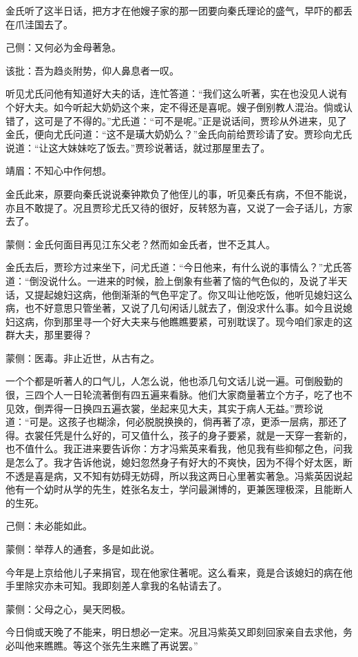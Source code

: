\begin{parag}
    金氏听了这半日话，把方才在他嫂子家的那一团要向秦氏理论的盛气，早吓的都丢在爪洼国去了。\begin{note}己侧：又何必为金母著急。\end{note}\begin{note}该批：吾为趋炎附势，仰人鼻息者一叹。\end{note}听见尤氏问他有知道好大夫的话，连忙答道：“我们这么听著，实在也没见人说有个好大夫。如今听起大奶奶这个来，定不得还是喜呢。嫂子倒别教人混治。倘或认错了，这可是了不得的。”尤氏道：“可不是呢。”正是说话间，贾珍从外进来，见了金氏，便向尤氏问道：“这不是璜大奶奶么？”金氏向前给贾珍请了安。贾珍向尤氏说道：“让这大妹妹吃了饭去。”贾珍说著话，就过那屋里去了。\begin{note}靖眉：不知心中作何想。\end{note}金氏此来，原要向秦氏说说秦钟欺负了他侄儿的事，听见秦氏有病，不但不能说，亦且不敢提了。况且贾珍尤氏又待的很好，反转怒为喜，又说了一会子话儿，方家去了。\begin{note}蒙侧：金氏何面目再见江东父老？然而如金氏者，世不乏其人。\end{note}
\end{parag}


\begin{parag}
    金氏去后，贾珍方过来坐下，问尤氏道：“今日他来，有什么说的事情么？”尤氏答道：“倒没说什么。一进来的时候，脸上倒象有些著了恼的气色似的，及说了半天话，又提起媳妇这病，他倒渐渐的气色平定了。你又叫让他吃饭，他听见媳妇这么病，也不好意思只管坐著，又说了几句闲话儿就去了，倒没求什么事。如今且说媳妇这病，你到那里寻一个好大夫来与他瞧瞧要紧，可别耽误了。现今咱们家走的这群大夫，那里要得？\begin{note}蒙侧：医毒。非止近世，从古有之。\end{note}一个个都是听著人的口气儿，人怎么说，他也添几句文话儿说一遍。可倒殷勤的很，三四个人一日轮流著倒有四五遍来看脉。他们大家商量著立个方子，吃了也不见效，倒弄得一日换四五遍衣裳，坐起来见大夫，其实于病人无益。”贾珍说道：“可是。这孩子也糊涂，何必脱脱换换的，倘再著了凉，更添一层病，那还了得。衣裳任凭是什么好的，可又值什么，孩子的身子要紧，就是一天穿一套新的，也不值什么。我正进来要告诉你：方才冯紫英来看我，他见我有些抑郁之色，问我是怎么了。我才告诉他说，媳妇忽然身子有好大的不爽快，因为不得个好太医，断不透是喜是病，又不知有妨碍无妨碍，所以我这两日心里著实著急。冯紫英因说起他有一个幼时从学的先生，姓张名友士，学问最渊博的，更兼医理极深，且能断人的生死。\begin{note}己侧：未必能如此。\end{note}\begin{note}蒙侧：举荐人的通套，多是如此说。\end{note}今年是上京给他儿子来捐官，现在他家住著呢。这么看来，竟是合该媳妇的病在他手里除灾亦未可知。我即刻差人拿我的名帖请去了。\begin{note}蒙侧：父母之心，昊天罔极。\end{note}今日倘或天晚了不能来，明日想必一定来。况且冯紫英又即刻回家亲自去求他，务必叫他来瞧瞧。等这个张先生来瞧了再说罢。”
\end{parag}


